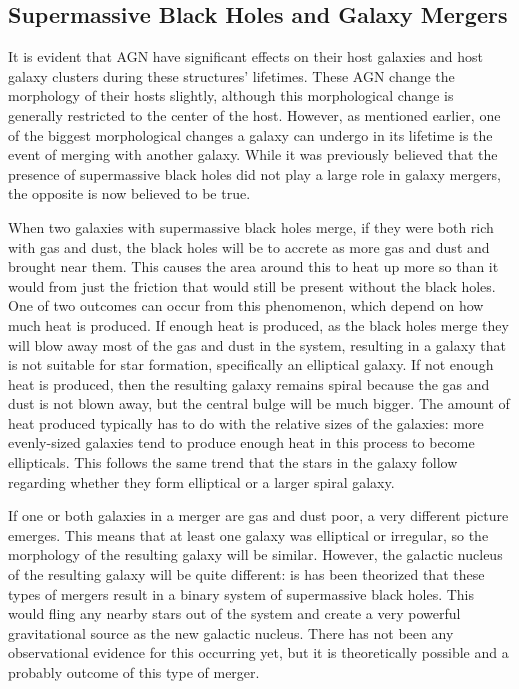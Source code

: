 \documentclass[12pt]{article}
\begin{document}
\subsection{Supermassive Black Holes and Galaxy Mergers}
It is evident that AGN have significant effects on their host galaxies and host
galaxy clusters during these structures' lifetimes.  These AGN change the
morphology of their hosts slightly, although this morphological change is
generally restricted to the center of the host.  However, as mentioned earlier,
one of the biggest morphological changes a galaxy can undergo in its lifetime is
the event of merging with another galaxy.  While it was previously believed that
the presence of supermassive black holes did not play a large role in galaxy
mergers, the opposite is now believed to be true.

When two galaxies with supermassive black holes merge, if they were both
rich with gas and dust, the black holes will be to accrete as more gas and dust
and brought near them.  This causes the area around this to heat up more so than
it would from just the friction that would still be present without the black
holes.  One of two outcomes can occur from this phenomenon, which depend on how
much heat is produced.  If enough heat is produced, as the black holes merge
they will blow away most of the gas and dust in the system, resulting in a
galaxy that is not suitable for star formation, specifically an elliptical
galaxy.  If not enough heat is produced, then the resulting galaxy remains
spiral because the gas and dust is not blown away, but the central bulge will be
much bigger.  The amount of heat produced typically has to do with the relative
sizes of the galaxies: more evenly-sized galaxies tend to produce enough heat in
this process to become ellipticals.  This follows the same trend that the stars
in the galaxy follow regarding whether they form elliptical or a larger spiral
galaxy.

If one or both galaxies in a merger are gas and dust poor, a very different
picture emerges.  This means that at least one galaxy was elliptical or
irregular, so the morphology of the resulting galaxy will be similar.  However,
the galactic nucleus of the resulting galaxy will be quite different: is has
been theorized that these types of mergers result in a binary system of
supermassive black holes.  This would fling any nearby stars out of the system
and create a very powerful gravitational source as the new galactic nucleus.
There has not been any observational evidence for this occurring yet, but it is
theoretically possible and a probably outcome of this type of merger.
\end{document}
